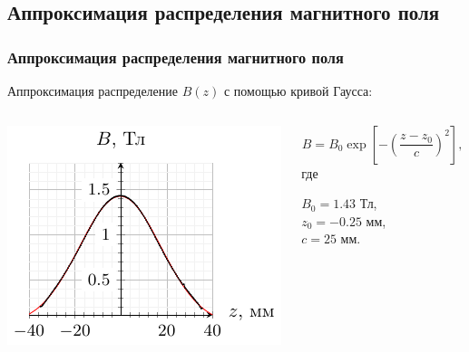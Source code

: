 \documentclass[10pt,pdf,hyperref={unicode}, dvipsnames]{beamer}
\begin{document}
\begin{frame}
	\subsection{Аппроксимация распределения магнитного поля}
	\frametitle{Аппроксимация распределения магнитного поля}
	Аппроксимация распределение $B(z)$ с помощью кривой Гаусса:\vspace{-1em}
	\begin{columns}
		\begin{column}{0.6\textwidth}
			\begin{center}
				\hspace{4em}
				\includegraphics[width=\textwidth]{images/b_from_z}
			\end{center}
		\end{column}
		\begin{column}[]{0.4\textwidth}
			\begin{equation*} 
				B=B_0%
				\exp 
				\left[
					-\left(
					\frac{z-z_0}{c}
					\right)^2
					\right], 
			\end{equation*}
			где 
			
			$B_0=1.43$ Тл, \\
			$z_0=-0.25$ мм,\\
			$c=25$ мм.
		\end{column}
	\end{columns}
\end{frame}
\end{document}
